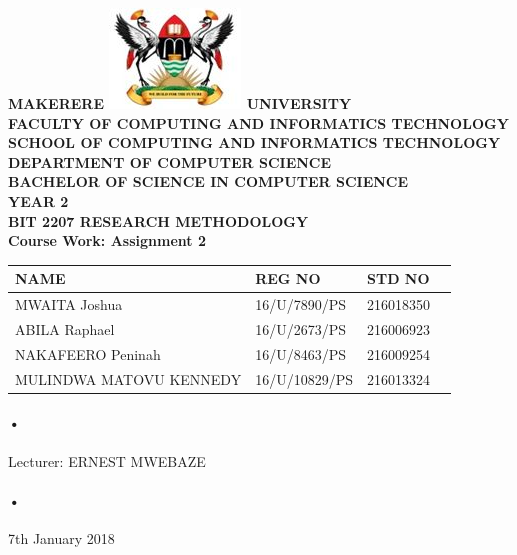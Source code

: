\documentclass[12pt]{article}
\begin{document}
\begin{Huge}
\begin{center}
\begin{normalsize}
\textbf{MAKERERE \includegraphics[scale=0.5]{logo} UNIVERSITY }\\


\textbf{FACULTY OF COMPUTING AND INFORMATICS TECHNOLOGY} \\
\textbf{SCHOOL OF COMPUTING AND INFORMATICS TECHNOLOGY} \\
\textbf{DEPARTMENT OF COMPUTER SCIENCE} \\
\textbf{BACHELOR OF SCIENCE IN COMPUTER SCIENCE} \\
\textbf{YEAR 2} \\
\textbf{BIT 2207 RESEARCH METHODOLOGY} \\
\textbf{Course Work: Assignment 2}\\
\end{normalsize}
\end{center}
\end{Huge}

\begin{center}
\begin{tabular}{|l|l|l|c|}
\hline NAME  & REG NO & STD NO \\\hline
MWAITA Joshua& 16/U/7890/PS & 216018350 \\\hline
ABILA Raphael& 16/U/2673/PS & 216006923 \\\hline
NAKAFEERO Peninah&16/U/8463/PS & 216009254 \\\hline
MULINDWA MATOVU KENNEDY& 16/U/10829/PS & 216013324 \\\hline
\end{tabular}
\paragraph{•}
Lecturer: ERNEST MWEBAZE \\
\paragraph{•}
7th January 2018

\end{center}
\end{document}
